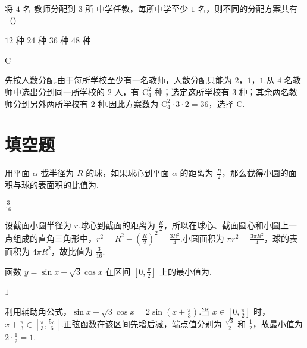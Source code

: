 \begin{problem}
将 \(4\text{ 名}\) 教师分配到 \(3\text{ 所}\) 中学任教，每所中学至少 \(1\text{ 名}\)，则不同的分配方案共有（\quad）

\choices
    {\(12\text{ 种}\)}
    {\(24\text{ 种}\)}
    {\(36\text{ 种}\)}
    {\(48\text{ 种}\)}
\end{problem}

\begin{answer}C\end{answer}

\begin{solution}
先按人数分配.由于每所学校至少有一名教师，人数分配只能为 \(2\)，\(1\)，\(1\).从 \(4\) 名教师中选出分到同一所学校的 \(2\) 人，有 \(\mathrm C_4^2\) 种；选定这所学校有 \(3\) 种；其余两名教师分到另外两所学校有 \(2\) 种.因此方案数为 \(\mathrm C_4^2\cdot3\cdot2=36\)，选择 C.
\end{solution}

\section{填空题}
\begin{problem}
用平面 \(\alpha\) 截半径为 \(R\) 的球，如果球心到平面 \(\alpha\) 的距离为 \(\frac{R}{2}\)，那么截得小圆的面积与球的表面积的比值为\fillinblank{}.
\end{problem}

\begin{answer}\(\frac{3}{16}\)\end{answer}

\begin{solution}
设截面小圆半径为 \(r\).球心到截面的距离为 \(\frac R2\)，所以在球心、截面圆心和小圆上一点组成的直角三角形中，\(r^2=R^2-\left(\frac R2\right)^2=\frac{3R^2}{4}\).小圆面积为 \(\pi r^2=\frac{3\pi R^2}{4}\)，球的表面积为 \(4\pi R^2\)，故比值为 \(\frac{3}{16}\).
\end{solution}

\begin{problem}
函数 \(y = \sin x + \sqrt{3}\cos x\) 在区间 \(\left[0, \frac{\pi}{2}\right]\) 上的最小值为\fillinblank{}.
\end{problem}

\begin{answer}\(1\)\end{answer}

\begin{solution}
利用辅助角公式，\(\sin x+\sqrt{3}\cos x=2\sin\left(x+\frac\pi3\right)\).当 \(x\in\left[0,\frac\pi2\right]\) 时，\(x+\frac\pi3\in\left[\frac\pi3,\frac{5\pi}{6}\right]\).正弦函数在该区间先增后减，端点值分别为 \(\frac{\sqrt3}{2}\) 和 \(\frac12\)，故最小值为 \(2\cdot\frac12=1\).
\end{solution}

